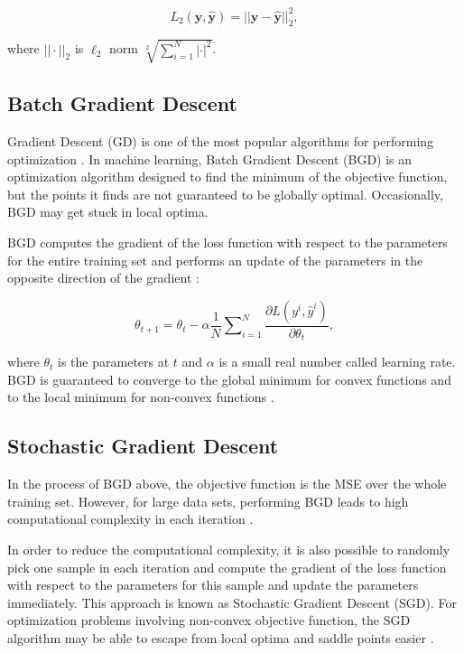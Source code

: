 \documentclass[
	parskip, 			   %
	twoside, 			   %
	DIV=14, 			   %
	BCOR=15.0mm, 		   %
	headsepline, 		   %
	open=right, 		   %
	captions=tableheading, %
	bibliography=totoc,    %
	numbers=noenddot       %
]{scrreprt}
\begin{document}
\begin{equation}
    \label{eq:SE_loss}
    L_{2} ( \mathbf{y}, \hat{\mathbf{y}} ) = ||\mathbf{y}-\hat{\mathbf{y}}||^{2}_{2},
\end{equation}

where $|| \cdot ||_{2}$ is $\ell_2$ norm $\sqrt[2]{\sum_{i=1}^N | \cdot |^2}$.


\subsection{Batch Gradient Descent}
Gradient Descent (GD) is one of the most popular algorithms for performing optimization \cite{ruder2016overview}. In machine learning, Batch Gradient Descent (BGD) is an optimization algorithm designed to find the minimum of the objective function, but the points it finds are not guaranteed to be globally optimal. Occasionally, BGD may get stuck in local optima.

BGD computes the gradient of the loss function with respect to the parameters for the entire training set and performs an update of the parameters in the opposite direction of the gradient \cite{ruder2016overview}:

\begin{equation}
    \label{eq:GD}
    \theta_{t+1} = \theta_{t} - \alpha \frac{1}{N} \sum\nolimits_{i=1}^N  \frac{\partial L (y^i, \hat{y}^i)}{\partial \theta_{t}},
\end{equation}

where $\theta_{t}$ is the parameters at $t$ and $\alpha$ is a small real number called learning rate. BGD is guaranteed to converge to the global minimum for convex functions and to the local minimum for non-convex functions \cite{ruder2016overview}.

\subsection{Stochastic Gradient Descent}
In the process of BGD above, the objective function is the MSE over the whole training set. However, for large data sets, performing BGD leads to high computational complexity in each iteration \cite{sun2019survey}.

In order to reduce the computational complexity, it is also possible to randomly pick one sample in each iteration and compute the gradient of the loss function with respect to the parameters for this sample and update the parameters immediately. This approach is known as Stochastic Gradient Descent (SGD). For optimization problems involving non-convex objective function, the SGD algorithm may be able to escape from local optima and saddle points easier \cite{sun2019survey}.
\end{document}
